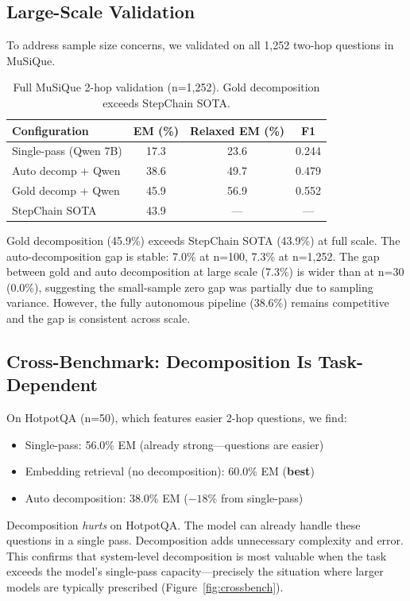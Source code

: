 \documentclass[11pt]{article}
\begin{document}
\subsection{Large-Scale Validation}

To address sample size concerns, we validated on all 1,252 two-hop questions in MuSiQue.

\begin{table}[htbp]
\centering
\caption{Full MuSiQue 2-hop validation (n=1,252). Gold decomposition exceeds StepChain SOTA.}
\label{tab:fullval}
\begin{tabular}{lccc}
\toprule
\textbf{Configuration} & \textbf{EM (\%)} & \textbf{Relaxed EM (\%)} & \textbf{F1} \\
\midrule
Single-pass (Qwen 7B) & 17.3 & 23.6 & 0.244 \\
Auto decomp + Qwen & 38.6 & 49.7 & 0.479 \\
Gold decomp + Qwen & 45.9 & 56.9 & 0.552 \\
\midrule
StepChain SOTA & 43.9 & --- & --- \\
\bottomrule
\end{tabular}
\end{table}

Gold decomposition (45.9\%) exceeds StepChain SOTA (43.9\%) at full scale. The auto-decomposition gap is stable: 7.0\% at n=100, 7.3\% at n=1,252. The gap between gold and auto decomposition at large scale (7.3\%) is wider than at n=30 (0.0\%), suggesting the small-sample zero gap was partially due to sampling variance. However, the fully autonomous pipeline (38.6\%) remains competitive and the gap is consistent across scale.

\subsection{Cross-Benchmark: Decomposition Is Task-Dependent}

On HotpotQA (n=50), which features easier 2-hop questions, we find:

\begin{itemize}[nosep]
    \item Single-pass: 56.0\% EM (already strong---questions are easier)
    \item Embedding retrieval (no decomposition): 60.0\% EM (\textbf{best})
    \item Auto decomposition: 38.0\% EM ($-18\%$ from single-pass)
\end{itemize}

Decomposition \emph{hurts} on HotpotQA. The model can already handle these questions in a single pass. Decomposition adds unnecessary complexity and error. This confirms that system-level decomposition is most valuable when the task exceeds the model's single-pass capacity---precisely the situation where larger models are typically prescribed (Figure~\ref{fig:crossbench}).
\end{document}
